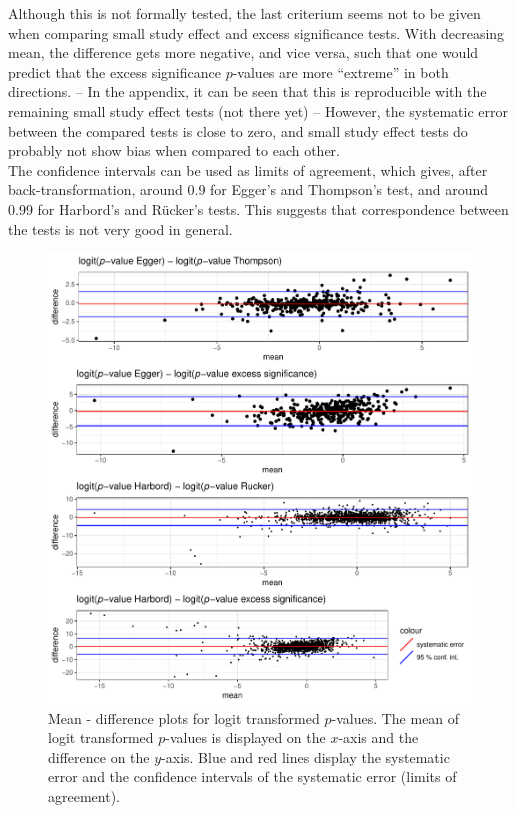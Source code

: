 Although this is not formally tested, the last criterium seems not to be given when comparing small study effect and excess significance tests. With decreasing mean, the difference gets more negative, and vice versa, such that one would predict that the excess significance $p$-values are more ``extreme'' in both directions. -- In the appendix, it can be seen that this is reproducible with the remaining small study effect tests (not there yet) -- However, the systematic error between the compared tests is close to zero, and small study effect tests do probably not show bias when compared to each other. \\
The confidence intervals can be used as limits of agreement, which gives, after back-transformation, around 0.9 for Egger's and Thompson's test, and around 0.99 for Harbord's and R\"ucker's tests. This suggests that correspondence between the tests is not very good in general. 

\begin{figure}
\begin{knitrout}
\color{fgcolor}

{\centering \includegraphics[width=\textwidth-3cm]{figure/ch03_figunnamed-chunk-4-1} 

}



\end{knitrout}
\caption{Mean - difference plots for logit transformed $p$-values. The mean of logit transformed $p$-values is displayed on the $x$-axis and the difference on the $y$-axis. Blue and red lines display the systematic error and the confidence intervals of the systematic error (limits of agreement).}
\label{fig:mean.diff.test}
\end{figure}

